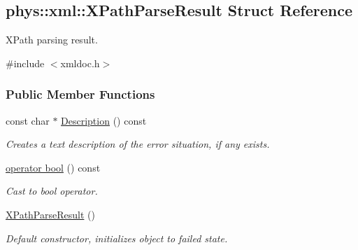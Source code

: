 \hypertarget{structphys_1_1xml_1_1XPathParseResult}{
\subsection{phys::xml::XPathParseResult Struct Reference}
\label{structphys_1_1xml_1_1XPathParseResult}
}


XPath parsing result.  




{\ttfamily \#include $<$xmldoc.h$>$}

\subsubsection*{Public Member Functions}
\begin{DoxyCompactItemize}
\item 
const char $\ast$ \hyperlink{structphys_1_1xml_1_1XPathParseResult_a458f459d8a537b5eec424d6a1c463541}{Description} () const 
\begin{DoxyCompactList}\small\item\em Creates a text description of the error situation, if any exists. \item\end{DoxyCompactList}\item 
\hyperlink{structphys_1_1xml_1_1XPathParseResult_a8dddf12100a6c40f9abcd8c0b7b37816}{operator bool} () const 
\begin{DoxyCompactList}\small\item\em Cast to bool operator. \item\end{DoxyCompactList}\item 
\hypertarget{structphys_1_1xml_1_1XPathParseResult_ac41f4db5604d32679933be58bc74aa23}{
\hyperlink{structphys_1_1xml_1_1XPathParseResult_ac41f4db5604d32679933be58bc74aa23}{XPathParseResult} ()}
\label{structphys_1_1xml_1_1XPathParseResult_ac41f4db5604d32679933be58bc74aa23}

\begin{DoxyCompactList}\small\item\em Default constructor, initializes object to failed state. \item\end{DoxyCompactList}\end{DoxyCompactItemize}
